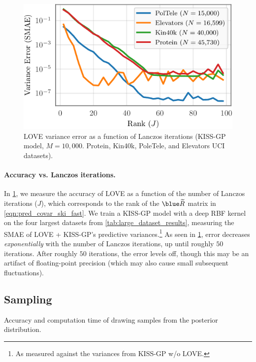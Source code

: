 \begin{figure}[t!]
  \centering
  \includegraphics[width=0.65\columnwidth]{figures/lanczos_accuracy.pdf}
  \vspace{-2ex}
  \caption[LOVE variance error as a function of Lanczos iterations.]{
    LOVE variance error as a function of Lanczos iterations
    (KISS-GP model, $M=10,\!000$. Protein, Kin40k, PoleTele, and Elevators UCI datasets).
    \label{fig:lanczos_accuracy}
  }
  \vspace{-1ex}
\end{figure}

\paragraph{Accuracy vs. Lanczos iterations.}
In \cref{fig:lanczos_accuracy}, we measure the accuracy of LOVE{} as a function of the number of Lanczos iterations ($J$), which corresponds to the rank of the $\blue \widetilde \bR$ matrix in \cref{eqn:pred_covar_ski_fast}.
We train a KISS-GP model with a deep RBF kernel on the four largest datasets from \cref{tab:large_dataset_results}, measuring the SMAE of LOVE + KISS-GP's predictive variances.\footnote{
  As measured against the variances from KISS-GP w/o LOVE.
}
As seen in \cref{fig:lanczos_accuracy}, error decreases \emph{exponentially} with the number of Lanczos iterations, up until roughly $50$ iterations.
After roughly $50$ iterations, the error levels off, though this may be an artifact of floating-point precision (which may also cause small subsequent fluctuations).



\subsection{Sampling}

\begin{table}[t!]
  \caption[Accuracy and computation time of drawing samples from the posterior distribution.]{
    Accuracy and computation time of drawing samples from the posterior distribution.
    \label{tab:sampling_results}
  }
  \vspace{0.5ex}
  \centering
  \resizebox{\textwidth}{!}{%
    
  }
  \vspace{1em}

  \resizebox{\textwidth}{!}{%
    
  }
\end{table}

